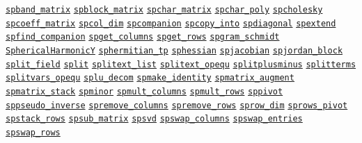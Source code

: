 \begin{list}{}
\hyperlink{operator:SPBAND_MATRIX}{\texttt{spband\_matrix}}
\hyperlink{operator:SPBLOCK_MATRIX}{\texttt{spblock\_matrix}}
\hyperlink{operator:SPCHAR_MATRIX}{\texttt{spchar\_matrix}}
\hyperlink{operator:SPCHAR_POLY}{\texttt{spchar\_poly}}
\hyperlink{operator:SPCHOLESKY}{\texttt{spcholesky}}
\hyperlink{operator:SPCOEFF_MATRIX}{\texttt{spcoeff\_matrix}}
\hyperlink{operator:SPCOL_DIM}{\texttt{spcol\_dim}}
\hyperlink{operator:SPCOMPANION}{\texttt{spcompanion}}
\hyperlink{operator:SPCOPY_INTO}{\texttt{spcopy\_into}}
\hyperlink{operator:SPDIAGONAL}{\texttt{spdiagonal}}
\hyperlink{operator:SPEXTEND}{\texttt{spextend}}
\hyperlink{operator:SPFIND_COMPANION}{\texttt{spfind\_companion}}
\hyperlink{operator:SPGET_COLUMNS}{\texttt{spget\_columns}}
\hyperlink{operator:SPGET_ROWS}{\texttt{spget\_rows}}
\hyperlink{operator:SPGRAM_SCHMIDT}{\texttt{spgram\_schmidt}}
\hyperlink{operator:SPHERICALHARMONICY}{\texttt{SphericalHarmonicY}}
\hyperlink{operator:SPHERMITIAN_TP}{\texttt{sphermitian\_tp}}
\hyperlink{operator:SPHESSIAN}{\texttt{sphessian}}
\hyperlink{operator:SPJACOBIAN}{\texttt{spjacobian}}
\hyperlink{operator:SPJORDAN_BLOCK}{\texttt{spjordan\_block}}
\hyperlink{operator:SPLIT_FIELD}{\texttt{split\_field}}
\hyperlink{operator:SPLIT}{\texttt{split}}
\hyperlink{operator:SPLITEXT_LIST}{\texttt{splitext\_list}}
\hyperlink{operator:SPLITEXT_OPEQU}{\texttt{splitext\_opequ}}
\hyperlink{operator:SPLITPLUSMINUS}{\texttt{splitplusminus}}
\hyperlink{operator:SPLITTERMS}{\texttt{splitterms}}
\hyperlink{operator:SPLITVARS_OPEQU}{\texttt{splitvars\_opequ}}
\hyperlink{operator:SPLU_DECOM}{\texttt{splu\_decom}}
\hyperlink{operator:SPMAKE_IDENTITY}{\texttt{spmake\_identity}}
\hyperlink{operator:SPMATRIX_AUGMENT}{\texttt{spmatrix\_augment}}
\hyperlink{operator:SPMATRIX_STACK}{\texttt{spmatrix\_stack}}
\hyperlink{operator:SPMINOR}{\texttt{spminor}}
\hyperlink{operator:SPMULT_COLUMNS}{\texttt{spmult\_columns}}
\hyperlink{operator:SPMULT_ROWS}{\texttt{spmult\_rows}}
\hyperlink{operator:SPPIVOT}{\texttt{sppivot}}
\hyperlink{operator:SPPSEUDO_INVERSE}{\texttt{sppseudo\_inverse}}
\hyperlink{operator:SPREMOVE_COLUMNS}{\texttt{spremove\_columns}}
\hyperlink{operator:SPREMOVE_ROWS}{\texttt{spremove\_rows}}
\hyperlink{operator:SPROW_DIM}{\texttt{sprow\_dim}}
\hyperlink{operator:SPROWS_PIVOT}{\texttt{sprows\_pivot}}
\hyperlink{operator:SPSTACK_ROWS}{\texttt{spstack\_rows}}
\hyperlink{operator:SPSUB_MATRIX}{\texttt{spsub\_matrix}}
\hyperlink{operator:SPSVD}{\texttt{spsvd}}
\hyperlink{operator:SPSWAP_COLUMNS}{\texttt{spswap\_columns}}
\hyperlink{operator:SPSWAP_ENTRIES}{\texttt{spswap\_entries}}
\hyperlink{operator:SPSWAP_ROWS}{\texttt{spswap\_rows}}

\end{list}

